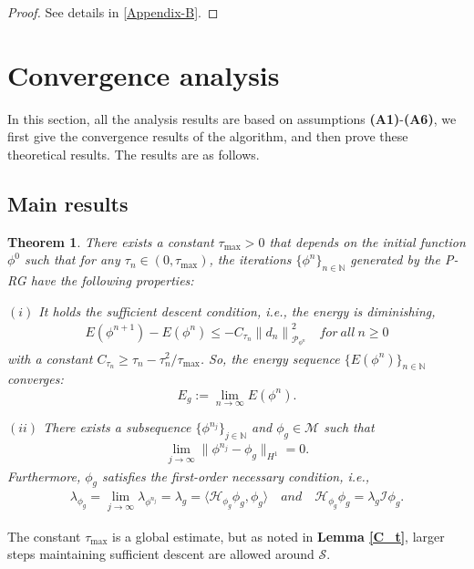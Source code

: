 \documentclass[preprint,3p]{elsarticle}
\newtheorem{thm}{Theorem}[section]
\begin{document}
\begin{proof}
	See details in \ref{Appendix-B}.
\end{proof}


\section{Convergence analysis}\label{Sec4} 
In this section, all the analysis results are based on assumptions {\bf (A1)}-{\bf (A6)}, we first give the convergence results of the algorithm, and then prove these theoretical results. The results are as follows.
\subsection{Main results}
\begin{thm}\label{Global-Convergence}
	There exists a constant $\tau_{\max}>0$ that depends on the initial function $\phi^0$ such that for any $\tau_n\in (0,\tau_{\max})$, the iterations $\{\phi^n\}_{n\in\mathbb{N}}$
	generated by the P-RG have the following properties:
		\item $(i)$ It holds the sufficient descent condition, i.e., the energy is diminishing,
		{\rm\begin{align*} 
				E(\phi^{n+1})-E(\phi^n)\le
				-C_{\tau_n}\left\|d_n \right\|^2_{\mathcal{P}_{\phi^n}}\quad for\ all\ n\ge0
		\end{align*}}
		with a constant $C_{\tau_n}\ge\tau_n-\tau_n^2/\tau_{\max}$. So, the energy sequence $\{E(\phi^n)\}_{n\in\mathbb{N}}$ converges: 
		\[
		E_g:=\lim\limits_{n\to\infty}E(\phi^n).
		\]
		\item $(ii)$ There exists a subsequence $\{\phi^{n_j}\}_{j\in\mathbb{N}}$ and $\phi_g\in\mathcal{M}$ such that
		\begin{align*}
			\lim\limits_{j\to\infty}\|\phi^{n_j}-\phi_g\|_{H^1}=0.
		\end{align*}
		Furthermore, $\phi_g$ satisfies the first-order necessary condition, i.e.,
		{\rm\begin{align*}
				\lambda_{\phi_g}=\lim\limits_{j\to\infty}\lambda_{\phi^{n_j}}=\lambda_g=\big\langle\mathcal{H}_{\phi_g}\phi_g,\phi_g\big\rangle\quad and \quad  \mathcal{H}_{\phi_g}\phi_g=\lambda_g\mathcal{I}\phi_g.
		\end{align*}}
\end{thm}
The constant $\tau_{\max}$ is a global estimate, but as noted in {\bf Lemma \ref{C_t}}, larger steps maintaining sufficient descent are allowed around $\mathcal{S}$. 
\end{document}
